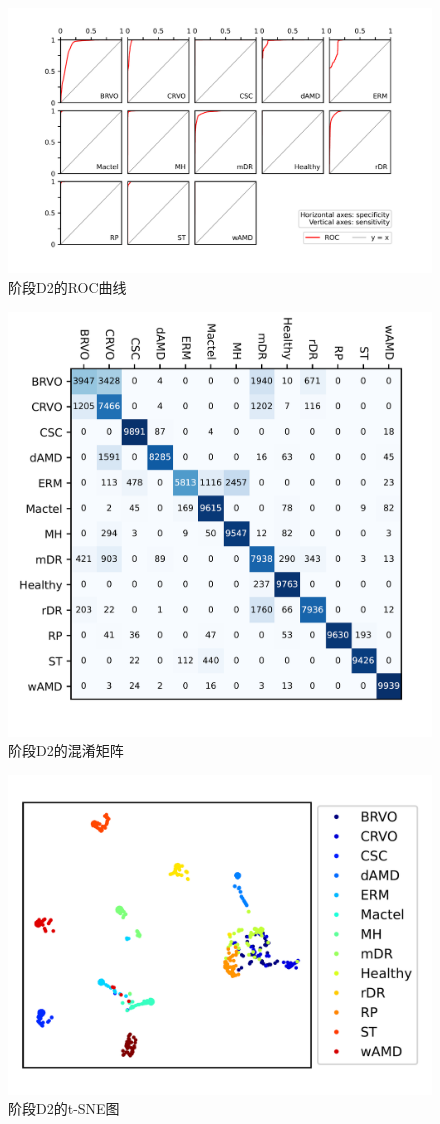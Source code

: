 \documentclass{article}
\begin{document}
	
	\begin{figure}[htbp]
		\centering
		\includegraphics[width=\linewidth]{Figs/diagnosis2_ROC.png}
		\vspace{-0.8cm}
		\caption{阶段D2的ROC曲线}
		\label{fig:D2_ROC}
	\end{figure}
	
	\begin{figure}[H]
		\centering
		\includegraphics[width=0.7\linewidth]{Figs/diagnosis2_confusion_matrix.png}
		\vspace{-0.8cm}
		\caption{阶段D2的混淆矩阵}
		\label{fig:D2_conf_mat}
	\end{figure}
	
	\begin{figure}[H]
		\centering
		\includegraphics[width=0.65\linewidth]{Figs/diagnosis2_tSNE.png}
		\vspace{-0.3cm}
		\caption{阶段D2的t-SNE图}
		\label{fig:D2_tSNE}
	\end{figure}
	
\end{document}
